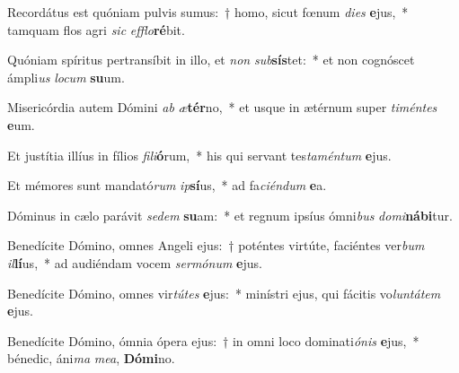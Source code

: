 \item Recordátus est quóniam pulvis sumus:~† homo, sicut fœnum \textit{di}\textit{es} \textbf{e}jus,~* tamquam flos agri \textit{sic} \textit{ef}\textit{flo}\textbf{ré}bit.
\item Quóniam spíritus pertransíbit in illo, et \textit{non} \textit{sub}\textbf{sís}tet:~* et non cognóscet ámpli\textit{us} \textit{lo}\textit{cum} \textbf{su}um.
\item Misericórdia autem Dómini \textit{ab} \textit{æ}\textbf{tér}no,~* et usque in ætérnum super \textit{ti}\textit{mén}\textit{tes} \textbf{e}um.
\item Et justítia illíus in fílios \textit{fi}\textit{li}\textbf{ó}rum,~* his qui servant tes\textit{ta}\textit{mén}\textit{tum} \textbf{e}jus.
\item Et mémores sunt mandató\textit{rum} \textit{ip}\textbf{sí}us,~* ad fa\textit{ci}\textit{én}\textit{dum} \textbf{e}a.
\item Dóminus in cælo parávit \textit{se}\textit{dem} \textbf{su}am:~* et regnum ipsíus ómni\textit{bus} \textit{do}\textit{mi}\textbf{ná}\textbf{bi}tur.
\item Benedícite Dómino, omnes Angeli ejus:~† poténtes virtúte, faciéntes ver\textit{bum} \textit{il}\textbf{lí}us,~* ad audiéndam vocem \textit{ser}\textit{mó}\textit{num} \textbf{e}jus.
\item Benedícite Dómino, omnes vir\textit{tú}\textit{tes} \textbf{e}jus:~* minístri ejus, qui fácitis vo\textit{lun}\textit{tá}\textit{tem} \textbf{e}jus.
\item Benedícite Dómino, ómnia ópera ejus:~† in omni loco dominati\textit{ó}\textit{nis} \textbf{e}jus,~* bénedic, áni\textit{ma} \textit{me}\textit{a}, \textbf{Dó}\textbf{mi}no.
